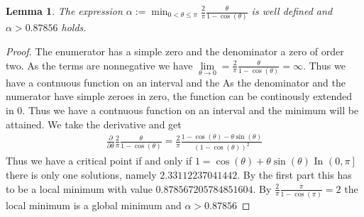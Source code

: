 \documentclass[12pt,a4paper]{article}
\theoremstyle{mythm}
\newtheorem{lem}[thm]{Lemma}
\begin{document}
\begin{lem}
\label{lem:alpha} 
The expression $ \alpha := \min_{0 < \theta \leq \pi   } \frac{ 2 }{ \pi } \frac{ \theta }{ 1- \cos( \theta )  }  $ is well defined and $ \alpha > 0.87856 $ holds.
\end{lem} 
\begin{proof}
The enumerator has a simple zero and the denominator a zero of order two. As the terms are nonnegative we have $ \lim\limits_{\theta  \to 0 } = \frac{ 2 }{ \pi  } \frac{ \theta }{ 1 - \cos( \theta )  }
= \infty $. Thus we have a contnuous function on an interval and the
As the denominator and the numerator have simple zeroes in zero, the function can be continously extended in 0. Thus we have a contnuous function on an interval and the
minimum will be attained.
We take the derivative and get
\begin{align*}
\frac{ \partial  }{ \partial \theta } \frac{ 2 }{ \pi  } \frac{ \theta }{ 1 - \cos( \theta )  } = \frac{ 2 }{ \pi } \frac{ 1 - \cos( \theta ) - \theta \sin( \theta )  }{ \left( 1 - \cos( \theta )  \right) ^{ 2 }   } 
\end{align*} 
Thus we have a critical point if and only if $ 1 = \cos( \theta ) + \theta \sin( \theta ) $
In $ \left( 0, \pi  \right]  $ there is only one solutions, namely $ 2.33112237041442 $.
By the first part this has to be a local minimum with value $ 0.878567205784851604 $.
By $ \frac{ 2 }{ \pi  } \frac{ \pi  }{ 1 - \cos( \pi )  } =2 $ the local minimum is a global minimum and $ \alpha > 0.87856 $
\end{proof}
\end{document}
